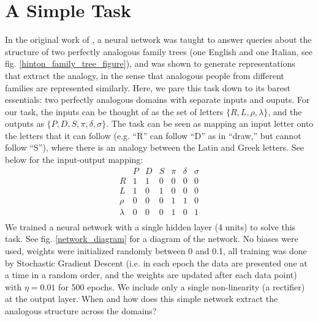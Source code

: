 \documentclass[10pt,letterpaper]{article}
\begin{document}
\section{A Simple Task}
In the original work of \citet{Hinton1986}, a neural network was taught to answer queries about the structure of two perfectly analogous family trees (one English and one Italian, see fig. \ref{hinton_family_tree_figure}), and was shown to generate representations that extract the analogy, in the sense that analogous people from different families are represented similarly. Here, we pare this task down to its barest essentials: two perfectly analogous domains with separate inputs and ouputs. For our task, the inputs can be thought of as the set of letters \(\{R,L,\rho,\lambda\}\), and the outputs as \(\{P,D,S,\pi,\delta,\sigma\}\). The task can be seen as mapping an input letter onto the letters that it can follow (e.g. ``R'' can follow ``D'' as in ``draw,'' but cannot follow ``S''), where there is an analogy between the Latin and Greek letters. See below for the input-output mapping: 
\[
\begin{array}{c|cccccc} 
& P & D & S & \pi & \delta & \sigma \\
\hline
R & 1 & 1 & 0 & 0 & 0 & 0 \\
L & 1 & 0 & 1 & 0 & 0 & 0 \\
\rho & 0 & 0 & 0 & 1 & 1 & 0\\
\lambda & 0 & 0 & 0 & 1 & 0 & 1\\
\end{array} 
\]
We trained a neural network with a single hidden layer (4 units) to solve this task. See fig. \ref{network_diagram} for a diagram of the network. No biases were used, weights were initialized randomly between 0 and 0.1, all training was done by Stochastic Gradient Descent (i.e. in each epoch the data are presented one at a time in a random order, and the weights are updated after each data point) with \(\eta = 0.01\) for 500 epochs. We include only a single non-linearity (a rectifier) at the output layer. When and how does this simple network extract the analogous structure across the domains? \par
\end{document}
